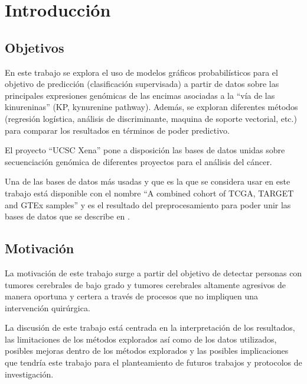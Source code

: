 
\chapter{Introducción}

\section{Objetivos}

En este trabajo se explora el uso de modelos gráficos probabilísticos para el objetivo de predicción (clasificación supervisada) a partir de datos sobre las principales expresiones genómicas de las encimas asociadas a la ``vía de las kinureninas'' (KP, kynurenine pathway). Además, se exploran diferentes métodos (regresión logística, análisis de discriminante, maquina de soporte vectorial, etc.) para comparar los resultados en términos de poder predictivo.

El proyecto ``UCSC Xena'' \cite{Goldman} pone a disposición las bases de datos unidas sobre secuenciación genómica de diferentes proyectos para el análisis del cáncer.

Una de las bases de datos más usadas y que es la que se considera usar en este trabajo está disponible con el nombre ``A combined cohort of TCGA, TARGET and GTEx samples'' y es el resultado del preprocesamiento para poder unir las bases de datos que se describe en \cite{Vivian}.

\section{Motivación}

La motivación de este trabajo surge a partir del objetivo de detectar personas con tumores cerebrales de bajo grado y tumores cerebrales altamente agresivos de manera oportuna y certera a través de procesos que no impliquen una intervención quirúrgica.

La discusión de este trabajo está centrada en la interpretación de los resultados, las limitaciones de los métodos explorados así como de los datos utilizados, posibles mejoras dentro de los métodos explorados y las posibles implicaciones que tendría este trabajo para el planteamiento de futuros trabajos y protocolos de investigación.
